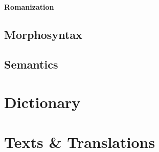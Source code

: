 \documentclass[a4paper,11pt,oneside,openany]{memoir}
\begin{document}
\subsection{Romanization}

\chapter{Morphosyntax}

\chapter{Semantics}

\part{Dictionary}



\part{Texts \& Translations}

\end{document}
